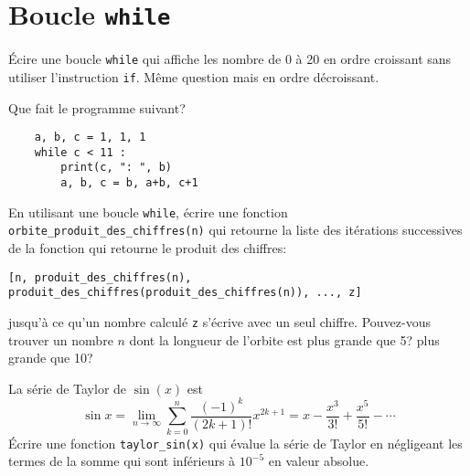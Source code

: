 \section{Boucle \texttt{while}}

\begin{question}
Écire une boucle \texttt{while} qui affiche les nombre de 0 à 20 en ordre
croissant sans utiliser l'instruction \texttt{if}. Même question mais en ordre
décroissant.
\end{question}

\begin{question}
Que fait le programme suivant?
\begin{verbatim}
    a, b, c = 1, 1, 1
    while c < 11 :
        print(c, ": ", b)
        a, b, c = b, a+b, c+1
\end{verbatim}
\end{question}

\begin{question}
En utilisant une boucle \texttt{while},
écrire une fonction \texttt{orbite\_produit\_des\_chiffres(n)} qui retourne
la liste des itérations successives de la fonction qui retourne le produit des
chiffres:
{\small
\begin{verbatim}
[n, produit_des_chiffres(n), produit_des_chiffres(produit_des_chiffres(n)), ..., z]
\end{verbatim}}
\noindent
jusqu'à ce qu'un nombre calculé \texttt{z} s'écrive avec un seul chiffre.
Pouvez-vous trouver un nombre $n$ dont la longueur de l'orbite est plus grande
que 5? plus grande que 10?
\end{question}

\begin{question}
La série de Taylor de $\sin(x)$ est
\[
    \sin x= \lim_{n\to\infty}\sum^{n}_{k=0} \frac{(-1)^k}{(2k+1)!} x^{2k+1} = x -
\frac{x^3}{3!} + \frac{x^5}{5!} - \cdots
\]
Écrire une fonction \texttt{taylor\_sin(x)} qui évalue la série de Taylor en
négligeant les termes de la somme qui sont inférieurs à $10^{-5}$ en valeur absolue.
\end{question}
